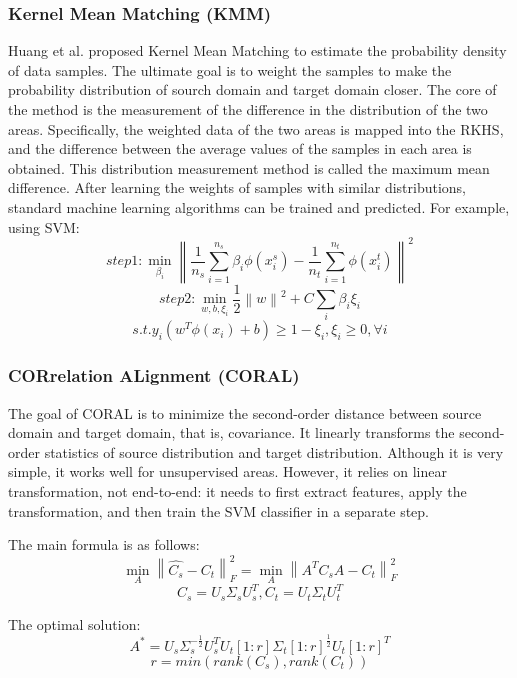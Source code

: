 \documentclass[conference]{IEEEtran}
\begin{document}
\subsubsection{Kernel Mean Matching (KMM)}
Huang et al. proposed Kernel Mean Matching\cite{gretton2009covariate} to estimate the probability density of data samples. The ultimate goal is to weight the samples to make the probability distribution of sourch domain and target domain closer. The core of the method is the measurement of the difference in the distribution of the two areas. Specifically, the weighted data of the two areas is mapped into the RKHS, and the difference between the average values of the samples in each area is obtained. This distribution measurement method is called the maximum mean difference. After learning the weights of samples with similar distributions, standard machine learning algorithms can be trained and predicted. For example, using SVM:
\begin{equation}
step1: \min\limits_{\beta_i}\left\|\frac{1}{n_s}\sum_{i=1}^{n_s}\beta_{i}\phi(x_i^s)-\frac{1}{n_t}\sum_{i=1}^{n_t}\phi(x_i^t)\right\|^2
\end{equation}
\begin{equation}
step2: \min\limits_{w,b,\xi_i}\frac{1}{2}\left\|w\right\|^2+C\sum_i\beta_i\xi_i
\end{equation}
\begin{equation}
s.t. y_i(w^T\phi(x_i)+b)\ge 1-\xi_i, \xi_i\ge 0, \forall i
\end{equation}
\subsubsection{CORrelation ALignment (CORAL)}
The goal of CORAL is to minimize the second-order distance between source domain and target domain, that is, covariance. It linearly transforms the second-order statistics of source distribution and target distribution. Although it is very simple, it works well for unsupervised areas. However, it relies on linear transformation, not end-to-end: it needs to first extract features, apply the transformation, and then train the SVM classifier in a separate step.\par
The main formula is as follows:
\begin{equation}
\min_A\left\|\widehat{C_s}-C_t\right\|^2_F=\min_A\left\|A^TC_sA-C_t\right\|^2_F
\end{equation}
\begin{equation}
C_s = U_s\Sigma_sU_s^T,C_t = U_t\Sigma_tU_t^T
\end{equation}\par
The optimal solution:
\begin{equation} A^*=U_s\Sigma_s^{-\frac{1}{2}}U_s^TU_t[1:r]\Sigma_t[1:r]^{\frac{1}{2}}U_t[1:r]^T
\end{equation}
\begin{equation}
r = min(rank(C_s),rank(C_t))
\end{equation}
\end{document}
